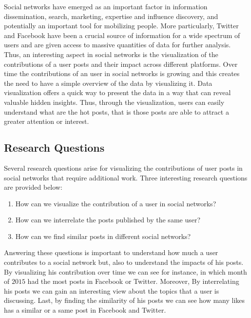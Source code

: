 Social networks have emerged as an important factor in information dissemination, search, marketing, expertise and influence discovery, and potentially an important tool for mobilizing people. More particularly, Twitter and Facebook have been a crucial source of information for a wide spectrum of users and are given access to massive quantities of data for further analysis. Thus, an interesting aspect in social networks is the visualization of the contributions of a user posts and their impact across different platforms. Over time the contributions of an user in social networks is growing and this creates the need to have a simple overview of the data by visualizing it. Data visualization offers a quick way to present the data in a way that can reveal valuable hidden insights. Thus, through the visualization, users can easily understand what are the hot posts, that is those posts are able to attract a greater attention or interest.


\subsection{Research Questions}


Several research questions arise for visualizing the contributions of user posts in social networks that require additional work. Three interesting research questions are provided below:


\begin{enumerate}
\item How can we visualize the contribution of a user in social networks?
\item How can we interrelate the posts published by the same user?
\item How can we find similar posts in different social networks?
\end{enumerate}


Answering these questions is important to understand how much a user contributes to a social network but, also to understand the impacts of his posts. By visualizing his contribution over time we can see for instance, in which month of $2015$ had the most posts in Facebook or Twitter. Moreover, By interrelating his posts we can gain an interesting view about the topics that a user is discussing. Last, by finding the similarity of his posts we can see how many likes has a similar or a same post in Facebook and Twitter.


